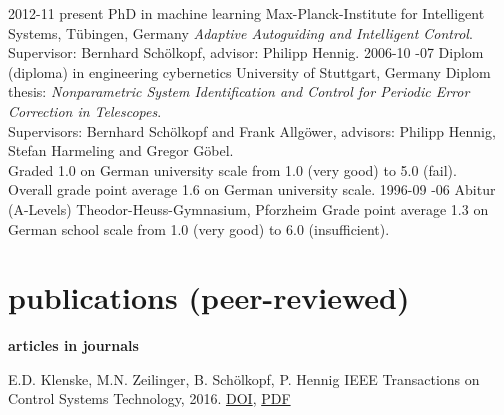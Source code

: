 \documentclass[]{k-cv} %
\begin{document}
\begin{entrylist}
\entry
{2012-11 \to present}
{PhD {\normalfont in machine learning}}
{Max-Planck-Institute for Intelligent Systems, T\"ubingen, Germany}
{\emph{Adaptive Autoguiding and Intelligent Control}.\\
Supervisor: Bernhard Sch\"olkopf, \mbox{advisor}: Philipp Hennig.}
\entry
{2006-10 -07}
{Diplom {(diploma) \normalfont in engineering cybernetics}}
{University of Stuttgart, Germany}
{Diplom thesis: \emph{Nonparametric System Identification and Control for
Periodic Error Correction in Telescopes}.\\
Supervisors: Bernhard Sch\"olkopf and Frank Allg\"ower, advisors: Philipp
Hennig, Stefan Harmeling and Gregor G\"obel. \\
Graded 1.0 on German university scale from 1.0 (very
good) to 5.0 (fail).\\
Overall grade point average 1.6 on German university
scale.}
\entry
{1996-09 -06}
{Abitur (A-Levels)}
{Theodor-Heuss-Gymnasium, Pforzheim}
{Grade point average 1.3 on German school scale from 1.0 (very good) to 6.0
\mbox{(insufficient)}.}
\end{entrylist}


\section{publications (peer-reviewed)}

{\Large \bfseries articles in journals}


{E.D. Klenske, M.N. Zeilinger, B. Sch\"olkopf, P. Hennig}
{IEEE Transactions on Control Systems Technology, 2016.
\href{http://dx.doi.org/10.1109/TCST.2015.2420629}{\to DOI},
\href{https://is.tue.mpg.de/uploads_file/attachment/attachment/9/%
Klenske_tcst__1_.pdf}{\to PDF}
}
\end{document}
